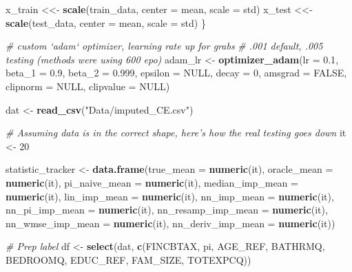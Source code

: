 \documentclass[12pt,twoside]{reedthesis}
\newenvironment{Shaded}{\begin{snugshade}}{\end{snugshade}}
\newcommand{\KeywordTok}[1]{\textcolor[rgb]{0.13,0.29,0.53}{\textbf{#1}}}
\newcommand{\DataTypeTok}[1]{\textcolor[rgb]{0.13,0.29,0.53}{#1}}
\newcommand{\DecValTok}[1]{\textcolor[rgb]{0.00,0.00,0.81}{#1}}
\newcommand{\FloatTok}[1]{\textcolor[rgb]{0.00,0.00,0.81}{#1}}
\newcommand{\StringTok}[1]{\textcolor[rgb]{0.31,0.60,0.02}{#1}}
\newcommand{\CommentTok}[1]{\textcolor[rgb]{0.56,0.35,0.01}{\textit{#1}}}
\newcommand{\OtherTok}[1]{\textcolor[rgb]{0.56,0.35,0.01}{#1}}
\newcommand{\NormalTok}[1]{#1}
\begin{document}
\begin{Shaded}
\begin{Highlighting}[]
\NormalTok{  x_train <<-}\StringTok{ }\KeywordTok{scale}\NormalTok{(train_data, }\DataTypeTok{center =}\NormalTok{ mean, }\DataTypeTok{scale =}\NormalTok{ std)}
\NormalTok{  x_test <<-}\StringTok{ }\KeywordTok{scale}\NormalTok{(test_data, }\DataTypeTok{center =}\NormalTok{ mean, }\DataTypeTok{scale =}\NormalTok{ std)}
\NormalTok{\}}

\CommentTok{# custom `adam` optimizer, learning rate up for grabs}
\CommentTok{# .001 default, .005 testing (methods were using 600 epo)}
\NormalTok{adam_lr <-}\StringTok{ }\KeywordTok{optimizer_adam}\NormalTok{(}\DataTypeTok{lr =} \FloatTok{0.1}\NormalTok{, }\DataTypeTok{beta_1 =} \FloatTok{0.9}\NormalTok{, }\DataTypeTok{beta_2 =} \FloatTok{0.999}\NormalTok{,}
                          \DataTypeTok{epsilon =} \OtherTok{NULL}\NormalTok{, }\DataTypeTok{decay =} \DecValTok{0}\NormalTok{, }\DataTypeTok{amsgrad =} \OtherTok{FALSE}\NormalTok{, }
                          \DataTypeTok{clipnorm =} \OtherTok{NULL}\NormalTok{, }\DataTypeTok{clipvalue =} \OtherTok{NULL}\NormalTok{)}

\NormalTok{dat <-}\StringTok{ }\KeywordTok{read_csv}\NormalTok{(}\StringTok{"Data/imputed_CE.csv"}\NormalTok{)}

\CommentTok{# Assuming data is in the correct shape, here's how the real testing goes down}
\NormalTok{it <-}\StringTok{ }\DecValTok{20}

\NormalTok{statistic_tracker <-}\StringTok{ }\KeywordTok{data.frame}\NormalTok{(}\DataTypeTok{true_mean =} \KeywordTok{numeric}\NormalTok{(it), }
                                \DataTypeTok{oracle_mean =} \KeywordTok{numeric}\NormalTok{(it),}
                                \DataTypeTok{pi_naive_mean =} \KeywordTok{numeric}\NormalTok{(it),}
                                \DataTypeTok{median_imp_mean =} \KeywordTok{numeric}\NormalTok{(it),}
                                \DataTypeTok{lin_imp_mean =} \KeywordTok{numeric}\NormalTok{(it),}
                                \DataTypeTok{nn_imp_mean =} \KeywordTok{numeric}\NormalTok{(it),}
                                \DataTypeTok{nn_pi_imp_mean =} \KeywordTok{numeric}\NormalTok{(it),}
                                \DataTypeTok{nn_resamp_imp_mean =} \KeywordTok{numeric}\NormalTok{(it),}
                                \DataTypeTok{nn_wmse_imp_mean =} \KeywordTok{numeric}\NormalTok{(it),}
                                \DataTypeTok{nn_deriv_imp_mean =} \KeywordTok{numeric}\NormalTok{(it))}

\CommentTok{# Prep label}
\NormalTok{df <-}\StringTok{ }\KeywordTok{select}\NormalTok{(dat, }\KeywordTok{c}\NormalTok{(FINCBTAX, pi, AGE_REF, BATHRMQ, BEDROOMQ, EDUC_REF, }
\NormalTok{                    FAM_SIZE, TOTEXPCQ))}


\end{Highlighting}
\end{Shaded}
\end{document}
